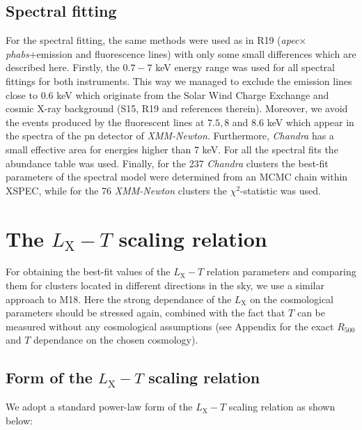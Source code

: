 \documentclass{aa}   %
\begin{document}
\subsection{Spectral fitting}


For the spectral fitting, the same methods were used as in R19 (\textit{apec}$\times$\textit{phabs}+emission and fluorescence lines) with only some small differences which are described here. Firstly, the $0.7-7$ keV energy range was used for all spectral fittings for both instruments. This way we managed to exclude the emission lines close to $0.6$ keV which originate from the Solar Wind Charge Exchange and cosmic X-ray background (S15, R19 and references therein). Moreover, we avoid the events produced by the fluorescent lines at $7.5, 8$ and $8.6$ keV which appear in the spectra of the pn detector of \textit{XMM-Newton}. Furthermore, \textit{Chandra} has a small effective area for energies higher than 7 keV. For all the spectral fits the \citet{aspl} abundance table was used. Finally, for the 237 \textit{Chandra} clusters the best-fit parameters of the spectral model were determined from an MCMC chain within XSPEC, while for the 76 \textit{XMM-Newton} clusters the $\chi^2$-statistic was used.
 
\section{The $L_{\text{X}}-T$ scaling relation} \label{analysis_method}

For obtaining the best-fit values of the $L_{\text{X}}-T$ relation parameters and comparing them for clusters located in different directions in the sky, we use a similar approach to M18. Here the strong dependance of the $L_{\text{X}}$ on the cosmological parameters should be stressed again, combined with the fact that $T$ can be measured without any cosmological assumptions (see Appendix for the exact $R_{500}$ and $T$ dependance on the chosen cosmology).  

\subsection{Form of the $L_{\text{X}}-T$ scaling relation}

We adopt a standard power-law form of the $L_{\text{X}}-T$ scaling relation as shown below:
\end{document}
